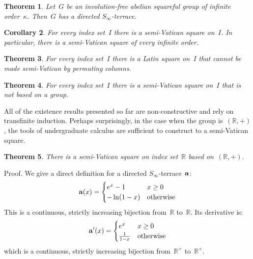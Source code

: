 \documentclass[12pt,a4paper]{article}
\newtheorem{thm}{Theorem}[section]
\newtheorem{cor}[thm]{Corollary}
\newcommand{\R}{\mathbb{R}}
\begin{document}
\begin{thm}\label{th:semi_T_infty}
Let~$G$ be an involution-free abelian squareful group of infinite order~$\kappa$.   Then~$G$ has a directed $S_{\infty}$-terrace.
\end{thm}

\begin{cor}\label{cor:semi_vatsquares}
For every index set~$I$ there is a semi-Vatican square on~$I$.  In particular, there is a semi-Vatican square of every infinite order.
\end{cor}

\begin{thm}\label{th:semi_notrcls}
For every index set~$I$ 
there is a Latin square on~$I$ that cannot be made semi-Vatican by permuting columns.
\end{thm}

\begin{thm}\label{th:semi_infvat}
For every index set~$I$ there is a semi-Vatican square on~$I$ that is not based on a  group.
\end{thm}

All of the existence results presented so far are non-constructive and rely on transfinite induction.  Perhaps surprisingly, in the case when the group is~$(\R, +)$, the tools of undergraduate calculus are sufficient to construct to a semi-Vatican square.


\begin{thm}\label{th:svr}
There is a semi-Vatican square on index set~$\R$ based on~$(\R,+)$.
\end{thm} 

\noindent
Proof.   We give a direct definition for a directed $S_{\infty}$-terrace~${\bf a}$:
\begin{equation*}
    {\bf a}(x) = \begin{cases}
               e^x   -1            & x \geq 0\\
               -\ln (1-x)       & \text{otherwise}
           \end{cases}
\end{equation*}
This is a continuous, strictly increasing bijection from~$\R$ to~$\R$.  Its derivative is:
\begin{equation*}
    {\bf a}'(x) = \begin{cases}
               e^x               & x \geq 0\\
              \frac{1}{1-x}       & \text{otherwise}
           \end{cases}
\end{equation*}
which is a continuous, strictly increasing bijection from~$\R^+$ to~$\R^+$.
\end{document}
